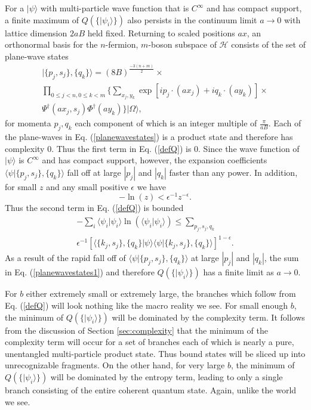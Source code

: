 \documentclass[twocolumn,amsmath,amssymb]{revtex4-1}
\begin{document}
For a $|\psi \rangle $ with multi-particle
wave function that is $C^\infty$ and has compact support, a
finite maximum of $Q( \{|\psi_i \rangle \})$ also persists in the continuum
limit $a \rightarrow 0$ with lattice dimension $2aB$ held fixed.
Returning to scaled positions $ax$, 
an orthonormal basis for the $n$-fermion, $m$-boson subspace of $\mathcal{H}$ 
consists of the set of 
plane-wave states
\begin{multline}
\label{planewavestates}
| \{p_j, s_j\}, \{q_k\} \rangle  = (8B)^{\frac{-3(n+m)}{2}} \times \\
\prod_{0 \le j < n, 0 \le k < m} \{\sum_{x_j, y_k}
\exp[ i p_j \cdot (a x_j) + i q_k \cdot (a y_k)] \times \\
\Psi^\dagger(a x_j, s_j)\Phi^\dagger(a y_k) \}|\Omega \rangle ,
\end{multline}  
for momenta $p_j, q_k$ each component of which is
an integer multiple of $\frac{ \pi}{a B}$.
Each of the plane-waves in Eq. (\ref{planewavestates}) 
is a product state and therefore has complexity 0.
Thus the first term in Eq. (\ref{defQ}) is 0.
Since the wave function of $|\psi \rangle $ is $C^\infty$ and has
compact support, however,
the expansion coefficients $\langle \psi | \{p_j, s_j\}, \{q_k\} \rangle $ fall
off at large $|p_j|$ and $ |q_k|$ faster than any power.
In addition, for small $z$ and any small
positive $\epsilon$ we have
\begin{equation}
\label{epsilonbound}
-\ln( z) < \epsilon^{-1} z^{-\epsilon}.
\end{equation}
Thus
the second term in Eq. (\ref{defQ}) is bounded 
\begin{multline}
\label{planewavestates1}
-\sum_i  \langle  \psi_i | \psi_i \rangle  \ln(  \langle  \psi_i |\psi_i \rangle ) \le
\sum_{p_j,s_j, q_k} \\ \epsilon^{-1}[ \langle  \{k_j,s_j\}, \{ q_k\}|\psi \rangle   \langle \psi|\{k_j,s_j\}, \{ q_k\} \rangle ]^{1-\epsilon}.
\end{multline}
As a result of the rapid fall off of $ \langle  \psi | \{p_j, s_j\}, \{q_k\} \rangle $ at large $|p_j|$ and $|q_k|$,
the sum in Eq. (\ref{planewavestates1}) and therefore $Q( \{|\psi_i \rangle \})$
has a finite limit as $a \rightarrow 0$.

For $b$ either 
extremely small or extremely large, the branches which follow from Eq. (\ref{defQ}) 
will
look nothing like the macro reality we see.  For small enough $b$,
the minimum of $Q( \{|\psi_i \rangle \})$ will be dominated by the complexity term.
It follows from the discussion of Section \ref{sec:complexity}
that the minimum of the complexity term will occur for a set of branches each of which is nearly
a pure, unentangled multi-particle product state. Thus bound states
will be sliced up into unrecognizable fragments. On the
other hand, for very large $b$, the minimum of $Q( \{|\psi_i \rangle \})$
will be dominated by the entropy term, leading to only 
a single branch consisting of the entire coherent quantum state. 
Again, unlike the world we see.
\end{document}
